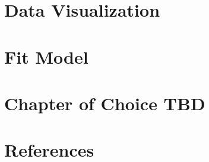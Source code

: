 \documentclass[
]{article}
\begin{document}
\pagebreak

\hypertarget{data-visualization}{%
\section{Data Visualization}\label{data-visualization}}

\pagebreak

\hypertarget{fit-model}{%
\section{Fit Model}\label{fit-model}}

\pagebreak

\hypertarget{chapter-of-choice-tbd}{%
\section{Chapter of Choice TBD}\label{chapter-of-choice-tbd}}

\pagebreak

\hypertarget{references}{%
\section{References}\label{references}}
\end{document}
